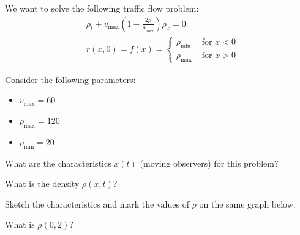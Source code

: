 \begin{slide}
\question \label{traffic:red}

\begin{problem}

We want to solve the following traffic flow problem:
\begin{align*}	
	& \rho_t + v_{\max} \left( 1 - \frac{2 \rho}{\rho_{\max}}\right) \rho_x = 0  \tag{Traffic flow model} \\
	& r(x,0) = f(x) = 
		\begin{cases}
			\rho_{\min}	& \text{ for } x<0\\
			\rho_{\max}	& \text{ for } x>0
		\end{cases}
\end{align*}

Consider the following parameters: 
\begin{itemize}
	\item $v_{\max}=60$
	\item $\rho_{\max} = 120$
	\item $\rho_{\min} = 20$
\end{itemize}
\end{problem}


\begin{parts}
	\item What are the characteristics $x(t)$ (moving observers) for this problem?

\begin{slidesonly}
	\vspace{3cm}	
\end{slidesonly}

	\item What is the density $\rho(x,t)$?
	\item Sketch the characteristics and mark the values of $\rho$ on the same graph below.
	
	\begin{center}
	\end{center}

	
	\item What is $\rho(0,2)$?
\end{parts}

	
\end{slide}



